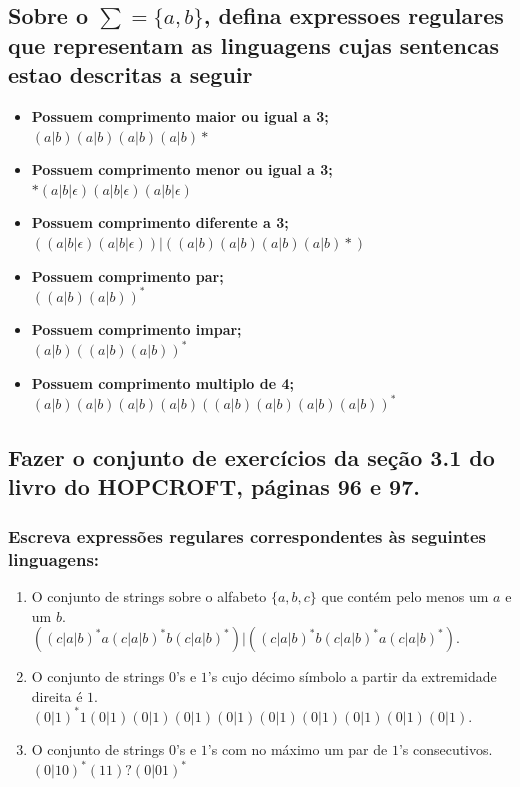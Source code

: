 \documentclass[a4paper,12pt]{article}
\begin{document}
    \subsection{Sobre o $\sum = \{a,b\}$, defina expressoes regulares que representam as linguagens cujas sentencas estao descritas a seguir} 
    \begin{itemize}
        \item \textbf{Possuem comprimento maior ou igual a 3;}
            \\ $(a|b)(a|b)(a|b)(a|b)*$
        \item \textbf{Possuem comprimento menor ou igual a 3;}
            \\ $*(a|b|\epsilon)(a|b|\epsilon)(a|b|\epsilon)$
        \item \textbf{Possuem comprimento diferente a 3;}
            \\ $((a|b|\epsilon)(a|b|\epsilon))|((a|b)(a|b)(a|b)(a|b)*)$
        \item \textbf{Possuem comprimento par;}
            \\ $((a|b)(a|b))^*$
        \item \textbf{Possuem comprimento impar;}
            \\ $(a|b)((a|b)(a|b))^*$
        \item \textbf{Possuem comprimento multiplo de 4;}
            \\ $(a|b)(a|b)(a|b)(a|b)((a|b)(a|b)(a|b)(a|b))^*$
    \end{itemize}

    \subsection{Fazer o conjunto de exercícios da seção 3.1 do livro do HOPCROFT, páginas 96 e 97.} 
        \subsubsection{Escreva expressões regulares corresponden\-tes às seguintes linguagens:}
            \begin{enumerate}[label={\bfseries \alph*)}]
                \item O conjunto de strings sobre o alfabeto $\{a, b, c\}$ que contém pelo menos um $a$ e um $b$.
                    \\ $((c|a|b)^* a(c|a|b)^* b(c|a|b)^*)|((c|a|b)^* b(c|a|b)^* a(c|a|b)^*)$.
                \item O conjunto de strings $0$'s e $1$'s cujo décimo símbolo a partir da extremidade direita é $1$.
                    \\ $(0|1)^* 1 (0|1)(0|1)(0|1)(0|1)(0|1)(0|1)(0|1)(0|1)(0|1)$.
                \item O conjunto de strings $0$'s e $1$'s com no máximo um par de $1$'s consecutivos.
                    \\ $(0|10)^*(11)?(0|01)^*$
            \end{enumerate}
            
\end{document}
